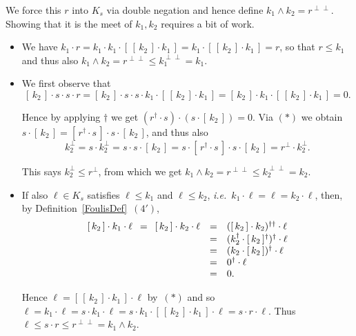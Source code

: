 \documentclass{article}
\newenvironment{proof}[1][Proof]{ \begin{trivlist}\item[\hskip \labelsep {\bfseries #1}]}{ \end{trivlist}}
\newcommand{\conjun}{\mathrel{\wedge}}
\newcommand{\sai}[1]{[\,#1\,]}
\begin{document}
\begin{proof}
\begin{enumerate}
\noindent We force this $r$ into $K_{s}$ via double negation and hence
define $k_{1}\conjun k_{2} = r^{\perp\perp}$. Showing that it is the
meet of $k_{1}, k_{2}$ requires a bit of work.
\begin{itemize}
\item We have $k_{1}\cdot r = k_{1} \cdot k_{1} \cdot \sai{\sai{k_{2}}\cdot
  k_{1}} = k_{1} \cdot \sai{\sai{k_{2}}\cdot k_{1}} = r$, so that $r \leq
  k_{1}$ and thus also $k_{1} \conjun k_{2} = r^{\perp\perp} \leq
  k_{1}^{\perp\perp} = k_{1}$.

\item We first observe that
$$\sai{k_{2}}\cdot s \cdot s \cdot r
=
\sai{k_{2}}\cdot s \cdot s \cdot k_{1} \cdot \sai{\sai{k_{2}}\cdot k_{1}}
=
\sai{k_2}\cdot k_{1} \cdot \sai{\sai{k_{2}}\cdot k_{1}}
=
0.$$

\noindent Hence by applying $\dag$ we get $(r^{\dag} \cdot s) \cdot
(s\cdot \sai{k_2}) = 0$. Via $(*)$ we obtain $s\cdot \sai{k_2} = 
\sai{r^{\dag}\cdot s} \cdot s \cdot \sai{k_2}$, and thus also
$$k_{2}^{\perp} 
= 
s\cdot k_{2}^{\perp} 
= 
s\cdot s\cdot \sai{k_2} 
= 
s\cdot \sai{r^{\dag}\cdot s} \cdot s \cdot \sai{k_2}
=
r^{\perp}\cdot k_{2}^{\perp}.$$

\noindent This says $k_{2}^{\perp} \leq r^{\perp}$, from
which we get $k_{1} \conjun k_{2} = r^{\perp\perp} \leq k_{2}^{\perp\perp}
= k_{2}$.

\item If also $\ell\in K_{s}$ satisfies $\ell \leq k_{1}$ and $\ell\leq k_{2}$,
\textit{i.e.}~$k_{1}\cdot \ell = \ell = k_{2}\cdot \ell$, then, by
Definition~\ref{FoulisDef}~$(4')$,
$$\begin{array}{rcl}
\sai{k_2}\cdot k_{1}\cdot \ell
\hspace*{\arraycolsep} = \hspace*{\arraycolsep}
\sai{k_2}\cdot k_{2} \cdot \ell
& = &
(\sai{k_2}\cdot k_{2})^{\dag\dag}\cdot\ell \\
& = &
(k_{2}^{\dag} \cdot \sai{k_2}^{\dag})^{\dag}\cdot\ell \\
& = &
(k_{2} \cdot \sai{k_2})^{\dag}\cdot\ell \\
& = &
0^{\dag}\cdot\ell \\
& = &
0.
\end{array}$$

\noindent Hence $\ell = \sai{\sai{k_{2}}\cdot k_{1}} \cdot \ell$
by~$(*)$ and so $\ell = k_{1}\cdot \ell = s\cdot k_{1}\cdot \ell =
s\cdot k_{1} \cdot \sai{\sai{k_{2}}\cdot k_{1}} \cdot \ell = s\cdot r\cdot
\ell$. Thus $\ell\leq s\cdot r \leq r^{\perp\perp} = k_{1} \conjun k_{2}$.
\end{itemize}


\end{enumerate}
\end{proof}
\end{document}

